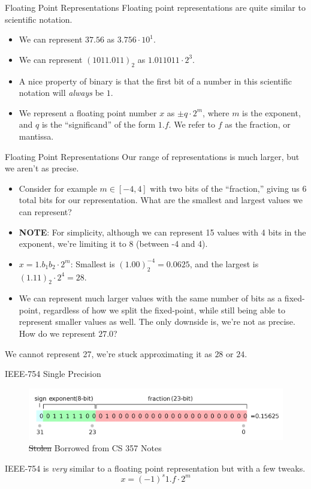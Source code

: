 \documentclass[aspectratio=169]{beamer}
\begin{document}
\begin{frame}{Floating Point Representations}
    Floating point representations are quite similar to scientific notation. \pause
    \begin{itemize}
        \item We can represent $37.56$ as $3.756 \cdot 10^{1}$. \pause
        \item We can represent $(1011.011)_2$ as $1.011011 \cdot 2^{3}$. \pause 
        \item A nice property of binary is that the first bit of a number in this scientific notation will \textit{always} be $1$. \pause
        \item We represent a floating point number $x$ as $\pm q \cdot 2^m$, where $m$ is the exponent, and $q$ is the ``significand'' of the form $1.f$. We refer to $f$ as the fraction, or mantissa.  
    \end{itemize}
\end{frame}

\begin{frame}{Floating Point Representations}
    Our range of representations is much larger, but we aren't as precise. \pause  
    \begin{itemize}
        \item Consider for example $m \in [-4, 4]$ with two bits of the ``fraction,'' giving us 6 total bits for our representation. What are the smallest and largest values we can represent? 
        \item \textbf{NOTE}: For simplicity, although we can represent 15 values with 4 bits in the exponent, we're limiting it to 8 (between -4 and 4). \pause
        \item $x = 1.b_1b_2 \cdot 2^{m}$: Smallest is $(1.00)_2^{-4} = 0.0625$, and the largest is $(1.11)_2 \cdot 2^4 = 28$. \pause  
        \item We can represent much larger values with the same number of bits as a fixed-point, regardless of how we split the fixed-point, while still being able to represent smaller values as well. The only downside is, we're not as precise. How do we represent $27.0$? \pause  
    \end{itemize}
    We cannot represent 27, we're stuck approximating it as $28$ or $24$. 
\end{frame}

\begin{frame}{IEEE-754 Single Precision}
    \begin{figure}
        \centering
        \includegraphics[width=\textwidth]{ieee_single.png}
        \caption{\st{Stolen} Borrowed from CS 357 Notes}
    \end{figure}

    IEEE-754 is \textit{very} similar to a floating point representation but with a few tweaks. 
    $$x = (-1)^s 1.f \cdot 2^m$$
\end{frame}
\end{document}
